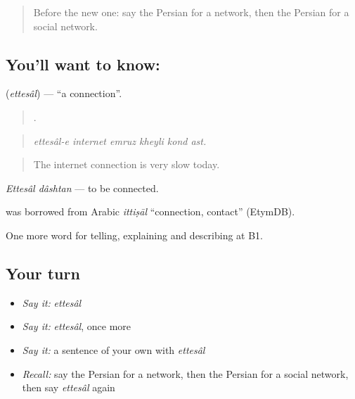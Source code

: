 \label{lesson:FA-C417-ettesal}



\begin{quote}
Before the new one: say the Persian for a network, then the Persian for a social network.
\end{quote}

\subsection*{You'll want to know: }
\textbf{} (\emph{ettesâl}) — \textquotedblleft{}a connection\textquotedblright{}.

\begin{quote}
     .
\end{quote}

\begin{quote}
\emph{ettesâl-e internet emruz kheyli kond ast.}
\end{quote}

\begin{quote}
The internet connection is very slow today.
\end{quote}

\emph{Ettesâl dâshtan} — to be connected.

\begin{cousinweb}
\textbf{} was borrowed from Arabic \emph{ittiṣāl} \textquotedblleft{}connection, contact\textquotedblright{} (EtymDB).
\end{cousinweb}

\begin{grammarlens}[title={What you've built}]
One more word for telling, explaining and describing at B1.
\end{grammarlens}

\subsection*{Your turn}
\begin{itemize}
\raggedright
  \item \emph{Say it:} \emph{ettesâl}
  \item \emph{Say it:} \emph{ettesâl}, once more
  \item \emph{Say it:} a sentence of your own with \emph{ettesâl}
  \item \emph{Recall:} say the Persian for a network, then the Persian for a social network, then say \emph{ettesâl} again
\end{itemize}

